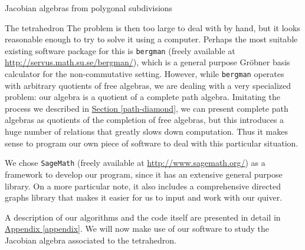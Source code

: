\begin{chapter}{Jacobian algebras from polygonal subdivisions}
\begin{section}{The tetrahedron}
The problem is then too large to deal with by hand, but it looks reasonable enough to try to solve it using a computer. Perhaps the most suitable existing software package for this is \texttt{bergman} (freely available at \url{http://servus.math.su.se/bergman/}), which is a general purpose Gröbner basis calculator for the non-commutative setting. However, while \texttt{bergman} operates with arbitrary quotients of free algebras, we are dealing with a very specialized problem: our algebra is a quotient of a complete path algebra. Imitating the process we described in \hyperref[path-diamond]{Section \ref*{path-diamond}}, we can present complete path algebras as quotients of the completion of free algebras, but this introduces a huge number of relations that greatly slows down computation. Thus it makes sense to program our own piece of software to deal with this particular situation.

We chose \texttt{SageMath} (freely available at \url{http://www.sagemath.org/}) as a framework to develop our program, since it has an extensive general purpose library. On a more particular note, it also includes a comprehensive directed graphs library that makes it easier for us to input and work with our quiver.

A description of our algorithms and the code itself are presented in detail in \hyperref[appendix]{Appendix \ref*{appendix}}. We will now make use of our software to study the Jacobian algebra associated to the tetrahedron.


\end{section}
\end{chapter}
